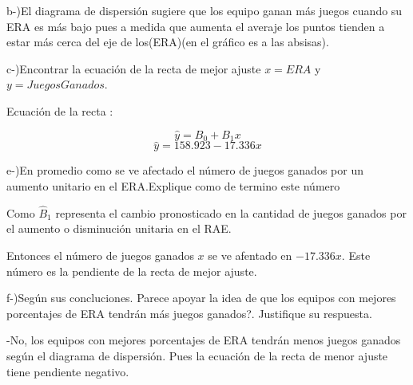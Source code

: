 \documentclass{article}
\begin{document}
		\begin{flushleft}
			b-)El diagrama de dispersi\'on sugiere que los equipo ganan m\'as juegos cuando su ERA es m\'as bajo pues a medida que aumenta el averaje los puntos tienden a estar m\'as cerca del eje de los(ERA)(en el gr\'afico es a las absisas).
		\end{flushleft}

		\begin{flushleft}
			c-)Encontrar la ecuaci\'on de la recta de mejor ajuste $x = ERA$ y $y = Juegos Ganados$.
		\end{flushleft}

		\begin{flushleft}
			Ecuaci\'on de la recta :
		\end{flushleft}
		$$ \hat y = B_{0} + B_{1}x$$
		$$ \hat y = 158.923 - 17.336 x$$

		\begin{flushleft}
			e-)En promedio como se ve afectado el n\'umero de juegos ganados por un aumento unitario en el ERA.Explique como de termino este n\'umero 
		\end{flushleft}

		\begin{flushleft}
			Como $\hat B_{1}$ representa el cambio pronosticado en la cantidad de juegos ganados por el aumento o disminuci\'on unitaria en el RAE.
		\end{flushleft}

		\begin{flushleft}
			Entonces el n\'umero de juegos ganados $x$ se ve afentado en $-17.336 x$. Este n\'umero es la pendiente de la recta de mejor ajuste.
		\end{flushleft}

		\begin{flushleft}
			f-)Seg\'un sus concluciones. \textquestiondown Parece apoyar la idea de que los equipos con mejores porcentajes de ERA tendr\'an m\'as juegos ganados?. Justifique su respuesta. 
		\end{flushleft}

		\begin{flushleft}
			-No, los equipos con mejores porcentajes de ERA tendr\'an menos juegos ganados seg\'un el diagrama de dispersi\'on. Pues la ecuaci\'on de la recta de menor ajuste tiene pendiente negativo.
		\end{flushleft}
		
\end{document}
